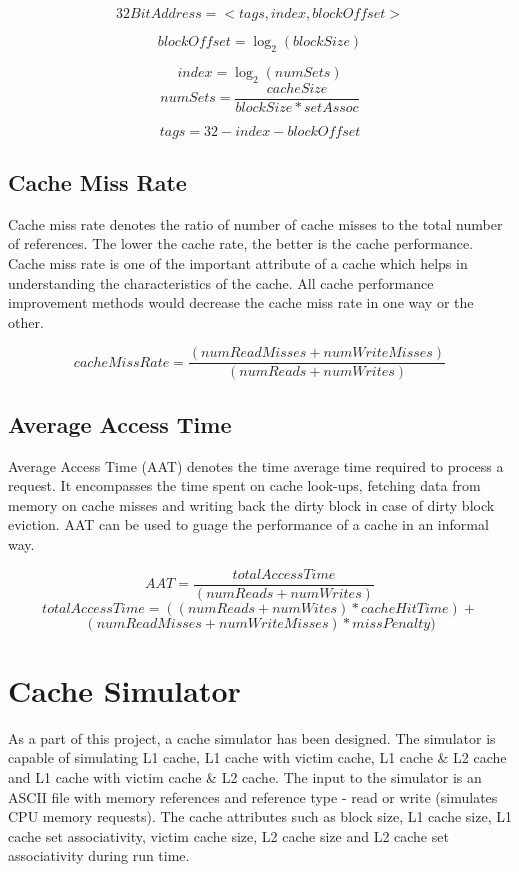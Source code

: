 \documentclass[a4paper]{article}
\begin{document}
\[32BitAddress = <tags, index, blockOffset>\]

\[blockOffset = \log_2 (blockSize)\]

\[index = \log_2 (numSets)\]
\[numSets = \frac{cacheSize}{blockSize * setAssoc}\]

\[tags = 32 - index - blockOffset\]

\subsection{Cache Miss Rate}
Cache miss rate denotes the ratio of number of cache misses to the total number of references. The lower the cache rate, the better is the cache performance. Cache miss rate is one of the important attribute of a cache which helps in understanding the characteristics of the cache. All cache performance improvement  methods would decrease the cache miss rate in one way or the other.

\[cacheMissRate = \frac{(numReadMisses + numWriteMisses)}{(numReads + numWrites)}\]

\subsection{Average Access Time}
Average Access Time (AAT) denotes the time average time required to process a request. It encompasses the time spent on cache look-ups, fetching data from memory on cache misses and writing back the dirty block in case of dirty block eviction. AAT can be used to guage the performance of a cache in an informal way. 

\[AAT = \frac{totalAccessTime}{(numReads + numWrites)}\]
\[totalAccessTime = ((numReads + numWites) * cacheHitTime) +\]
                             \[(numReadMisses + numWriteMisses) * missPenalty)\]


\section{Cache Simulator}
As a part of this project, a cache simulator has been designed. The simulator is capable of simulating L1 cache, L1 cache with victim cache, L1 cache \& L2 cache and L1 cache with victim cache \& L2 cache. The input to the simulator is an ASCII file with memory references and reference type - read or write (simulates CPU memory requests). The cache attributes such as block size, L1 cache size, L1 cache set associativity, victim cache size, L2 cache size and L2 cache set associativity during run time.
\end{document}
